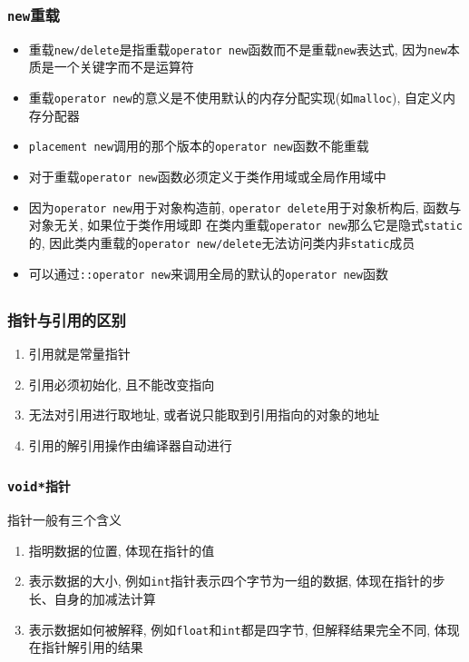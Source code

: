 \subsubsection{{\tt new}重载}

\begin{itemize}
	\item 重载{\tt new/delete}是指重载{\tt operator new}函数而不是重载{\tt new}表达式, 因为{\tt new}本质是一个关键字而不是运算符
	\item 重载{\tt operator new}的意义是不使用默认的内存分配实现(如{\tt malloc}), 自定义内存分配器
	\item {\tt placement new}调用的那个版本的{\tt operator new}函数不能重载
	\item 对于重载{\tt operator new}函数必须定义于类作用域或全局作用域中
	\item 因为{\tt operator new}用于对象构造前, 
			{\tt operator delete}用于对象析构后, 函数与对象无关, 如果位于类作用域即
			在类内重载{\tt operator new}那么它是隐式{\tt static}的, 
			因此类内重载的{\tt operator new/delete}无法访问类内非{\tt static}成员
	\item 可以通过{\tt::operator new}来调用全局的默认的{\tt operator new}函数
\end{itemize}

\subsection{\color{purple}{指针与引用}}
\subsubsection{指针与引用的区别}
\begin{enumerate}
	\item 引用就是常量指针
	\item 引用必须初始化, 且不能改变指向
	\item 无法对引用进行取地址, 或者说只能取到引用指向的对象的地址
	\item 引用的解引用操作由编译器自动进行
\end{enumerate}
\subsubsection{\tt{void*}指针}
指针一般有三个含义
\begin{enumerate}
	\item 指明数据的位置, 体现在指针的值
	\item 表示数据的大小, 例如{\tt int}指针表示四个字节为一组的数据, 体现在指针的步长、自身的加减法计算
	\item 表示数据如何被解释, 例如{\tt float}和{\tt int}都是四字节, 但解释结果完全不同, 体现在指针解引用的结果
\end{enumerate}

